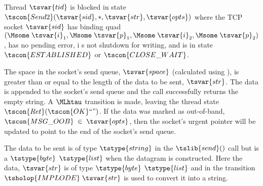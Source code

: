 {{    Thread $\tsvar{tid}$ is blocked in state $\tscon{Send2}(\tsvar{sid},*,\tsvar{str},\tsvar{opts})$ where the TCP socket $\tsvar{sid}$ has
    binding quad $(\Msome  \;\tsvar{i}_{1},\Msome  \;\tsvar{p}_{1},\Msome  \;\tsvar{i}_{2},\Msome  \;\tsvar{p}_{2})$, has no pending error, i
s not shutdown for
    writing, and is in state $\tscon{ESTABLISHED}$ or $\tscon{CLOSE\_WAIT}$.

    The space in the socket's send queue, $\tsvar{space}$ (calculated using ),
    is greater than or equal to the length of the data to be sent, $\tsvar{str}$. The data is appended to
    the socket's send queue and the call successfully returns the empty string. A $\MLhtau $
    transition is made, leaving the thread state $\tscon{Ret} (\tscon{OK} \text{``''})$. If the data was marked as
    out-of-band, $\tscon{MSG\_OOB} \;\in  \;\tsvar{opts}$, then the socket's urgent pointer will be updated to point to
    the end of the socket's send queue.


    The data to be sent is of type $\tstype{string}$ in the $\tslib{send}()$ call but is a $\tstype{byte}$ $\tstype{list}$ when
    the datagram is constructed. Here the data, $\tsvar{str}$ is of type $\tstype{byte}$ $\tstype{list}$ and in the
    transition $\tsholop{IMPLODE} \;\tsvar{str}$ is used to convert it into a string.


\rrulepad }
}


